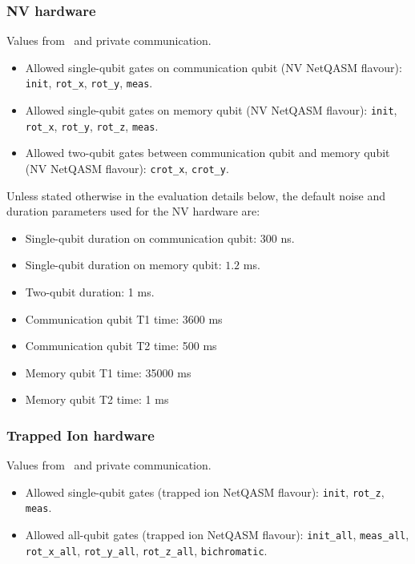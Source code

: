\subsubsection{NV hardware}
Values from~\cite{avis2023requirements} and private communication.

\begin{itemize}
  \item Allowed single-qubit gates on communication qubit (NV NetQASM flavour): \texttt{init}, \texttt{rot\_x}, \texttt{rot\_y}, \texttt{meas}.
  \item Allowed single-qubit gates on memory qubit (NV NetQASM flavour): \texttt{init}, \texttt{rot\_x}, \texttt{rot\_y}, \texttt{rot\_z}, \texttt{meas}.
  \item Allowed two-qubit gates between communication qubit and memory qubit (NV NetQASM flavour): \texttt{crot\_x}, \texttt{crot\_y}.
\end{itemize}

Unless stated otherwise in the evaluation details below, the default noise and duration parameters used for the NV hardware are:
\begin{itemize}
  \item Single-qubit duration on communication qubit: 300 ns.
  \item Single-qubit duration on memory qubit: $1.2$ ms.
  \item Two-qubit duration: 1 ms.
  \item Communication qubit T1 time: 3600 ms
  \item Communication qubit T2 time: 500 ms
  \item Memory qubit T1 time: 35000 ms
  \item Memory qubit T2 time: 1 ms
\end{itemize}

\subsubsection{Trapped Ion hardware}
Values from~\cite{avis2023requirements} and private communication.

\begin{itemize}
  \item Allowed single-qubit gates (trapped ion NetQASM flavour): \texttt{init}, \texttt{rot\_z}, \texttt{meas}.
  \item Allowed all-qubit gates (trapped ion NetQASM flavour): \texttt{init\_all}, \texttt{meas\_all}, \texttt{rot\_x\_all}, \texttt{rot\_y\_all}, \texttt{rot\_z\_all}, \texttt{bichromatic}.
\end{itemize}


